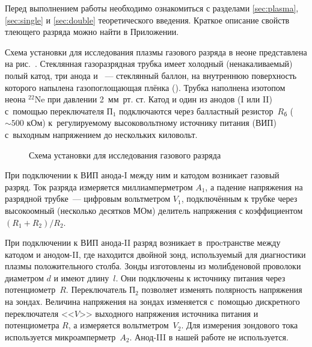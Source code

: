 


Перед выполнением работы необходимо ознакомиться с разделами
\ref{sec:plasma}, \ref{sec:single} и \ref{sec:double} теоретического введения.
Краткое описание свойств тлеющего разряда можно найти в Приложении.

Схема установки для исследования плазмы газового разряда в неоне представлена на
рис.~. Стеклянная газоразрядная
трубка имеет холодный (ненакаливаемый) полый катод, три анода и
~--- стеклянный баллон, на
внутреннюю поверхность которого напылена газопоглощающая плёнка
(). Трубка наполнена изотопом неона
$^{22}$Ne при давлении 2~мм~рт. ст. Катод и один из анодов (I или II) с~помощью
переключателя $\text{П}_1$ подключаются через
балластный резистор~$R_\text{б}$ ($\sim500$ кОм) к~регулируемому высоковольтному
источнику питания (ВИП) с~выходным
напряжением до нескольких киловольт.

\begin{figure}[h!]
    \centering
	\caption{Схема установки для исследования газового разряда}
\end{figure}

При подключении к ВИП анода-I между ним и катодом возникает газовый разряд. Ток
разряда измеряется миллиамперметром
$A_1$, а падение напряжения на разрядной трубке~--- цифровым вольтметром
$V_{1}$, подключённым к трубке через
высокоомный (несколько десятков МОм) делитель напряжения с коэффициентом
$(R_1+R_2)/R_2$.

При подключении к ВИП анода-II разряд возникает в~проcтранстве между катодом и
анодом-II, где находится двойной зонд,
используемый для диагностики плазмы положительного столба. Зонды изготовлены из
молибденовой проволоки диаметром
$d$ и имеют длину~$l$. Они подключены к источнику питания через
потенциометр~$R$. Переключатель
$\text{П}_2$ позволяет изменять полярность напряжения на зондах. Величина
напряжения на зондах изменяется с~помощью дискретного
переключателя <<$V$>> выходного напряжения источника питания и потенциометра
$R$, а измеряется вольтметром~$V_2$. Для
измерения зондового тока используется микроамперметр~$A_2$.
Анод-III в нашей работе не используется.


